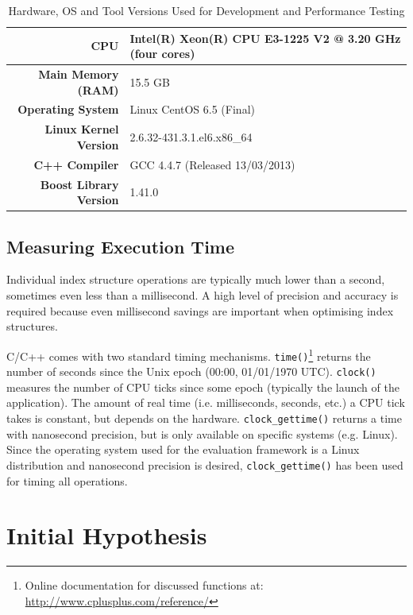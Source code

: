 \begin{table}
	\centering
	\begin{tabular}{|r|l|}
		\hline
		\textbf{CPU} & Intel(R) Xeon(R) CPU E3-1225 V2 @ 3.20 GHz (four cores) \\
		\hline
		\textbf{Main Memory (RAM)} & 15.5 GB \\
		\hline
		\textbf{Operating System} & Linux CentOS 6.5 (Final) \\
		\hline
		\textbf{Linux Kernel Version} & 2.6.32-431.3.1.el6.x86\_64 \\
		\hline
		\textbf{C++ Compiler} & GCC 4.4.7 (Released 13/03/2013) \\
		\hline
		\textbf{Boost Library Version} & 1.41.0 \\
		\hline
	\end{tabular}
	\caption{Hardware, OS and Tool Versions Used for Development and Performance Testing}
	\label{tab:system-specifications}
\end{table}

\subsection{Measuring Execution Time}

Individual index structure operations are typically much lower than a second, sometimes even less than a millisecond. A high level of precision and accuracy is required because even millisecond savings are important when optimising index structures.

C/C++ comes with two standard timing mechanisms. \texttt{time()}\footnote{Online documentation for discussed functions at: \url{http://www.cplusplus.com/reference/}} returns the number of seconds since the Unix epoch (00:00, 01/01/1970 UTC). \texttt{clock()} measures the number of CPU ticks since some epoch (typically the launch of the application). The amount of real time (i.e. milliseconds, seconds, etc.) a CPU tick takes is constant, but depends on the hardware. \texttt{clock\_gettime()} returns a time with nanosecond precision, but is only available on specific systems (e.g. Linux). Since the operating system used for the evaluation framework is a Linux distribution and nanosecond precision is desired, \texttt{clock\_gettime()} has been used for timing all operations.

\section{Initial Hypothesis}
\label{sec:initial-hypothesis}

